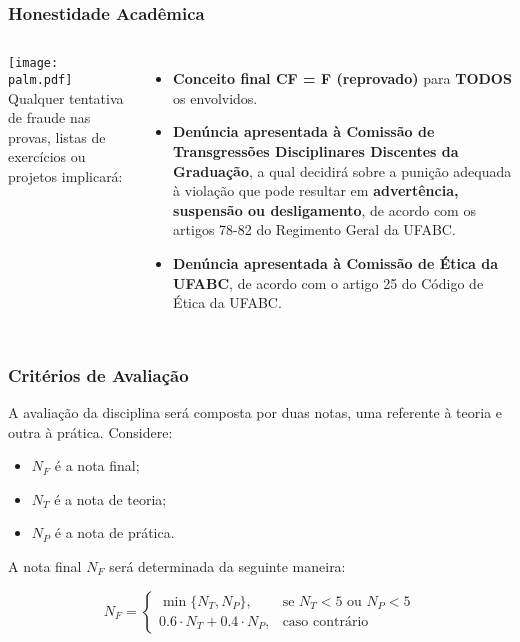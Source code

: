\documentclass[Ligatures=TeX,table,brazil,svgnames,usetotalslideindicator,comp
ress,10pt]{beamer}
\begin{document}
\begin{frame}
  \frametitle{Honestidade Acadêmica}

\begin{columns}
  \centering
  \texttt{[image: palm.pdf]}
  Qualquer tentativa de fraude nas provas, listas de exercícios ou projetos implicará:
  \begin{itemize}
  \item\textbf{Conceito final CF = F (reprovado)} para \textbf{TODOS} os envolvidos.
  \item \textbf{Denúncia apresentada à Comissão de Transgressões Disciplinares
    Discentes da Graduação}, a qual decidirá sobre a punição adequada à
    violação que pode resultar em \textbf{advertência, suspensão ou
    desligamento}, de acordo com os artigos 78-82 do Regimento Geral da
    UFABC.
  \item \textbf{Denúncia apresentada à Comissão de Ética da UFABC}, de acordo
    com o artigo 25 do Código de Ética da UFABC.
  \end{itemize}
\end{columns}
\end{frame}

\begin{frame}
  \frametitle{Critérios de Avaliação}
  A avaliação da disciplina será composta por duas notas, uma referente
à teoria e outra à prática. Considere:

\begin{itemize}
\item \(N_F\) é a nota final;
\item \(N_T\) é a nota de teoria;
\item \(N_P\) é a nota de prática.
\end{itemize}


A nota final \(N_F\) será determinada da seguinte maneira:

\begin{equation*}
N_F =
    \begin{cases}
        \min\{N_T, N_P\}                ,& \text{se } N_T < 5 \text{ ou } N_P < 5 \\
        0.6 \cdot N_T + 0.4 \cdot N_P ,& \text{caso contrário}
    \end{cases}
\end{equation*}

\end{frame}
\end{document}
